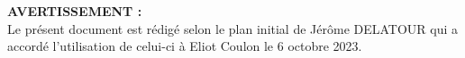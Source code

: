 \noindent
\textbf{AVERTISSEMENT :}\\
Le présent document est rédigé selon le plan initial de Jérôme DELATOUR qui a accordé l'utilisation de celui-ci à Eliot Coulon le 6 octobre 2023. \\
